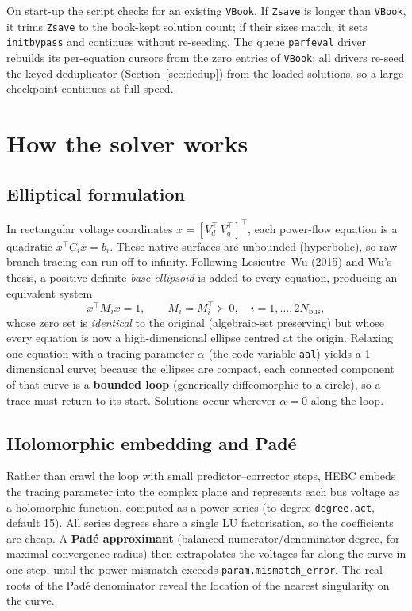 \documentclass[11pt,a4paper]{article}
\newcommand{\code}[1]{\texttt{#1}}
\begin{document}
On start-up the script checks for an existing \code{VBook}. If \code{Zsave} is longer than
\code{VBook}, it trims \code{Zsave} to the book-kept solution count; if their sizes match,
it sets \code{initbypass} and continues without re-seeding. The queue \code{parfeval} driver
rebuilds its per-equation cursors from the zero entries of \code{VBook}; all drivers re-seed
the keyed deduplicator (Section~\ref{sec:dedup}) from the loaded solutions, so a large
checkpoint continues at full speed.



\section{How the solver works}

\subsection{Elliptical formulation}
In rectangular voltage coordinates $x=[V_d^\top\ V_q^\top]^\top$, each power-flow
equation is a quadratic $x^\top C_i x = b_i$. These native surfaces are unbounded
(hyperbolic), so raw branch tracing can run off to infinity. Following
Lesieutre--Wu (2015) and Wu's thesis, a positive-definite \emph{base
ellipsoid} is added to every equation, producing an equivalent system
\[
  x^\top M_i x = 1, \qquad M_i = M_i^\top \succ 0, \quad i=1,\dots,2N_{\text{bus}},
\]
whose zero set is \emph{identical} to the original (algebraic-set preserving) but whose
every equation is now a high-dimensional ellipse centred at the origin. Relaxing one
equation with a tracing parameter $\alpha$ (the code variable \code{aal}) yields a
1-dimensional curve; because the ellipses are compact, each connected component of that
curve is a \textbf{bounded loop} (generically diffeomorphic to a circle), so a trace must
return to its start. Solutions occur wherever $\alpha=0$ along the loop.

\subsection{Holomorphic embedding and Pad\'e}
Rather than crawl the loop with small predictor--corrector steps, HEBC embeds the tracing
parameter into the complex plane and represents each bus voltage as a holomorphic
function, computed as a power series (to degree \code{degree.act}, default 15). All
series degrees share a single LU factorisation, so the coefficients are cheap. A
\textbf{Pad\'e approximant} (balanced numerator/denominator degree, for maximal
convergence radius) then extrapolates the voltages far along the curve in one step, until
the power mismatch exceeds \code{param.mismatch_error}. The real roots of the Pad\'e
denominator reveal the location of the nearest singularity on the curve.
\end{document}
